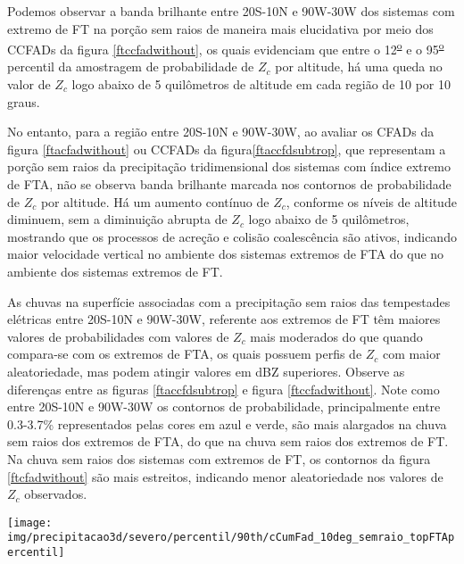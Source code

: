 Podemos observar a banda brilhante entre 20S-10N e 90W-30W  dos sistemas com  extremo de FT na porção sem raios de maneira mais elucidativa por meio dos CCFADs da figura \ref{ftccfadwithout}, os quais evidenciam que entre o 12\textsuperscript{\underline{o}} e o 95\textsuperscript{\underline{o}} percentil da amostragem de probabilidade de $Z_c$ por altitude, há uma queda no valor de $Z_c$ logo abaixo de 5 quilômetros de altitude em cada região de 10 por 10 graus. 

No entanto, para a região entre 20S-10N e 90W-30W, ao avaliar os CFADs da figura \ref{ftacfadwithout} ou CCFADs da figura\ref{ftaccfdsubtrop}, que representam a porção sem raios da precipitação tridimensional dos sistemas com índice extremo de FTA, não se observa banda brilhante marcada nos contornos de probabilidade de $Z_c$ por altitude. Há um aumento contínuo de $Z_c$, conforme os níveis de altitude diminuem, sem a diminuição abrupta de $Z_c$ logo abaixo de 5 quilômetros, mostrando que os processos de acreção e colisão coalescência são ativos, indicando maior velocidade vertical no ambiente dos sistemas extremos de FTA do que no ambiente dos sistemas extremos de FT. 


As chuvas na superfície associadas com a precipitação sem raios das tempestades elétricas entre 20S-10N e 90W-30W, referente aos extremos de FT têm maiores valores de probabilidades com valores de $Z_c$ mais moderados do que quando compara-se com os extremos de FTA, os quais possuem perfis de $Z_c$ com maior aleatoriedade, mas podem atingir valores em dBZ superiores. Observe as diferenças entre as figuras \ref{ftaccfdsubtrop} e figura \ref{ftccfadwithout}. Note como entre 20S-10N e 90W-30W os contornos de probabilidade, principalmente entre 0.3-3.7\% representados pelas cores em azul e verde, são mais alargados na chuva sem raios dos extremos de FTA, do que na chuva sem raios dos extremos de FT. Na chuva sem raios dos sistemas com extremos de FT, os contornos da figura \ref{ftcfadwithout} são mais estreitos, indicando menor aleatoriedade nos valores de $Z_c$ observados.

\begin{sidewaysfigure}%
  \centering
  \texttt{[image: img/precipitacao3d/severo/percentil/90th/cCumFad\_10deg\_semraio\_topFTApercentil]}
  \caption{CCFDs para os extremos de FTA. Porção da precipitação sem raios.}
  \label{ftaccfdsubtrop}   
\end{sidewaysfigure} 

